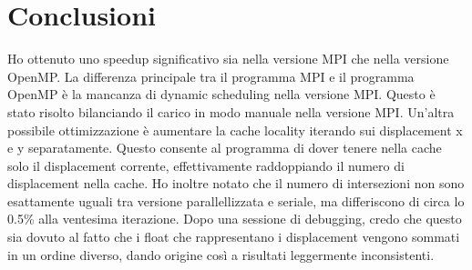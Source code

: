 \documentclass[a4paper,11pt, twoside]{report}
\begin{document}
\section*{Conclusioni}
Ho ottenuto uno speedup significativo sia nella versione MPI che nella versione OpenMP.
La differenza principale tra il programma MPI e il programma OpenMP è la mancanza di dynamic scheduling nella versione MPI.
Questo è stato risolto bilanciando il carico in modo manuale nella versione MPI.
Un'altra possibile ottimizzazione è aumentare la cache locality iterando sui displacement x e y separatamente.
Questo consente al programma di dover tenere nella cache solo il displacement corrente, effettivamente raddoppiando il numero di displacement nella cache.
Ho inoltre notato che il numero di intersezioni non sono esattamente uguali tra versione parallellizzata e seriale, ma differiscono di circa lo 0.5\% alla ventesima iterazione.
Dopo una sessione di debugging, credo che questo sia dovuto al fatto che i float che rappresentano i displacement vengono sommati in un ordine diverso, dando origine così a risultati leggermente inconsistenti.
\end{document}
